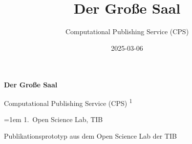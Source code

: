 \documentclass[
  a4paper,
  openany]{book}
\title{Der Große Saal}
\author{Computational Publishing Service (CPS)}
\date{2025-03-06}
\begin{document}
  \begin{frontmatter}
  \begin{titlepage}






  \begin{tcolorbox}


  \centering

  {\headingfont\Huge\bfseries\nohyphens{Der Große
  Saal}}\\[1\baselineskip]

  \end{tcolorbox}

  \bigbreak

  \begin{tcolorbox}
  \centering
      {\centering\large{Computational Publishing Service (CPS)}}%
      {\textsuperscript{1}}%


  \vspace{2\baselineskip} 

  \hangindent=1em
  {1}.~{Open Science Lab, TIB}%


  \vspace{1\baselineskip} 


  \end{tcolorbox}



  \vfill

  \vspace{1\baselineskip} 

  \begin{tcolorbox}
  \centering

  {
    Publikationsprototyp aus dem Open Science Lab der TIB
  }
  \end{tcolorbox}
  \end{titlepage}
  \end{frontmatter}
\end{document}
